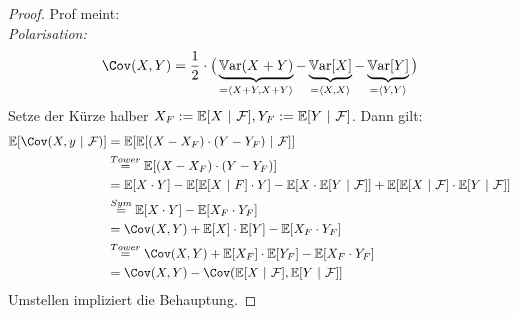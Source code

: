 \documentclass[12pt,a4paper]{article}
\begin{document}
\begin{proof}
Prof meint:\\
\textit{Polarisation:} 
\begin{align*}
\Cov(X,Y)=\frac{1}{2}\cdot\big(\underbrace{\Var(X+Y)}_{=\langle X+Y,X+Y\rangle}-\underbrace{\Var[X]}_{=\langle X,X\rangle}-\underbrace{\Var[Y]}_{=\langle Y,Y\rangle}\big)
\end{align*}
Setze der Kürze halber $X_F:=\mathbb{E}[X~|~\mathcal{F}], Y_F:=\mathbb{E}[Y~|~\mathcal{F}]$. Dann gilt:
\begin{align*}
\E[\Cov(X,y~|~\F)]
&=\E[\E[(X-X_F)\cdot(Y-Y_F)~|~\F]]\\
&\stackeq{Tower}
\E[(X-X_F)\cdot(Y-Y_F)]\\
&=\E[X\cdot Y]-\E[\E[X~|~F]\cdot Y]
-\E[X\cdot\E[Y~|~\F]]+\E[\E[X~|~\F]\cdot\E[Y~|~\F]]\\
&\stackeq{Sym}
\E[X\cdot Y]-\E[X_F\cdot Y_F]\\
&=\Cov(X,Y)+\E[X]\cdot\E[Y]-\E[X_F\cdot Y_F]\\
&\stackeq{Tower}
\Cov(X,Y)+\E[X_F]\cdot\E[Y_F]-\E[X_F\cdot Y_F]\\
&=\Cov(X,Y)-\Cov(\E[X~|~\F],\E[Y~|~\F]]
\end{align*}
Umstellen impliziert die Behauptung.
\end{proof}
\end{document}
